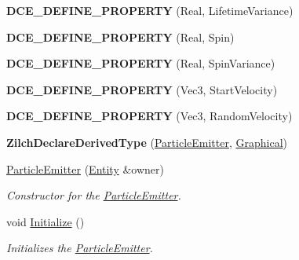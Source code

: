 \begin{DoxyCompactItemize}
\item 
\hypertarget{classDCEngine_1_1Components_1_1ParticleEmitter_ae67fa5de00b715d8fd02d158536e1235}{{\bfseries D\-C\-E\-\_\-\-D\-E\-F\-I\-N\-E\-\_\-\-P\-R\-O\-P\-E\-R\-T\-Y} (Real, Lifetime\-Variance)}\label{classDCEngine_1_1Components_1_1ParticleEmitter_ae67fa5de00b715d8fd02d158536e1235}

\item 
\hypertarget{classDCEngine_1_1Components_1_1ParticleEmitter_a5b42b88cf2de0215f6c4d010de2611af}{{\bfseries D\-C\-E\-\_\-\-D\-E\-F\-I\-N\-E\-\_\-\-P\-R\-O\-P\-E\-R\-T\-Y} (Real, Spin)}\label{classDCEngine_1_1Components_1_1ParticleEmitter_a5b42b88cf2de0215f6c4d010de2611af}

\item 
\hypertarget{classDCEngine_1_1Components_1_1ParticleEmitter_a5a5e11e713758e9875f3d026aecf83af}{{\bfseries D\-C\-E\-\_\-\-D\-E\-F\-I\-N\-E\-\_\-\-P\-R\-O\-P\-E\-R\-T\-Y} (Real, Spin\-Variance)}\label{classDCEngine_1_1Components_1_1ParticleEmitter_a5a5e11e713758e9875f3d026aecf83af}

\item 
\hypertarget{classDCEngine_1_1Components_1_1ParticleEmitter_aba57f2787426efdf24b4591d26419ef8}{{\bfseries D\-C\-E\-\_\-\-D\-E\-F\-I\-N\-E\-\_\-\-P\-R\-O\-P\-E\-R\-T\-Y} (Vec3, Start\-Velocity)}\label{classDCEngine_1_1Components_1_1ParticleEmitter_aba57f2787426efdf24b4591d26419ef8}

\item 
\hypertarget{classDCEngine_1_1Components_1_1ParticleEmitter_adfd4842fbe7015a5cdf60b0862636af2}{{\bfseries D\-C\-E\-\_\-\-D\-E\-F\-I\-N\-E\-\_\-\-P\-R\-O\-P\-E\-R\-T\-Y} (Vec3, Random\-Velocity)}\label{classDCEngine_1_1Components_1_1ParticleEmitter_adfd4842fbe7015a5cdf60b0862636af2}

\item 
\hypertarget{classDCEngine_1_1Components_1_1ParticleEmitter_a87488f69d476f07110822f23996715a7}{{\bfseries Zilch\-Declare\-Derived\-Type} (\hyperlink{classDCEngine_1_1Components_1_1ParticleEmitter}{Particle\-Emitter}, \hyperlink{classDCEngine_1_1Components_1_1Graphical}{Graphical})}\label{classDCEngine_1_1Components_1_1ParticleEmitter_a87488f69d476f07110822f23996715a7}

\item 
\hyperlink{classDCEngine_1_1Components_1_1ParticleEmitter_ac766975d33d5945f9dcac4e7b496fa72}{Particle\-Emitter} (\hyperlink{classDCEngine_1_1Entity}{Entity} \&owner)
\begin{DoxyCompactList}\small\item\em Constructor for the \hyperlink{classDCEngine_1_1Components_1_1ParticleEmitter}{Particle\-Emitter}.  \end{DoxyCompactList}\item 
void \hyperlink{classDCEngine_1_1Components_1_1ParticleEmitter_ac1cf667ade1f128470dae9933e1a888a}{Initialize} ()
\begin{DoxyCompactList}\small\item\em Initializes the \hyperlink{classDCEngine_1_1Components_1_1ParticleEmitter}{Particle\-Emitter}.  \end{DoxyCompactList}\end{DoxyCompactItemize}
